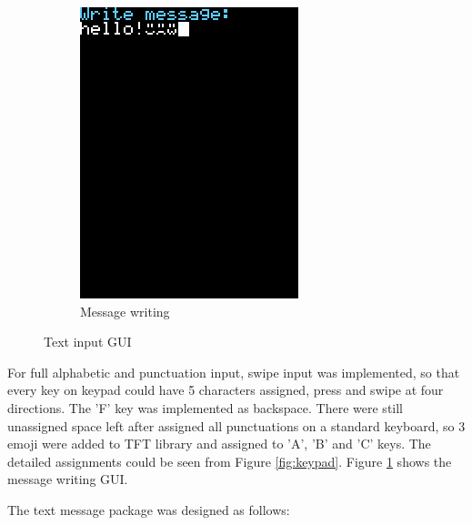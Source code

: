 \documentclass[a4paper,notitlepage,10pt]{report}
\begin{document}
\begin{multicols}{2}
\begin{figure}[H]
\begin{subfigure}[b]{0.4\columnwidth}
		\includegraphics[width=\textwidth]{cap_text}
		\caption{Message writing}
		\label{fig:capText}
	\end{subfigure}
	\caption{Text input GUI}
	\label{fig:capTextInput}
\end{figure}
\vspace{6pt}

For full alphabetic and punctuation input, swipe input was implemented, so that every key on keypad could have 5 characters assigned, press and swipe at four directions. The 'F' key was implemented as backspace. There were still unassigned space left after assigned all punctuations on a standard keyboard, so 3 emoji were added to TFT library and assigned to 'A', 'B' and 'C' keys. The detailed assignments could be seen from Figure \ref{fig:keypad}. Figure \ref{fig:capText} shows the message writing GUI.
\vspace{6pt}

The text message package was designed as follows:
\vspace{6pt}


\end{multicols}
\end{document}
